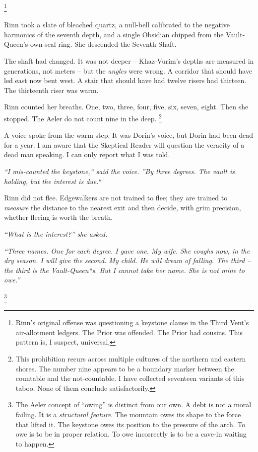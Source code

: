 \documentclass[12pt]{article}
\begin{document}
\footnote{Rinn's original offense was questioning a keystone clause in the Third Vent's air-allotment ledgers. The Prior was offended. The Prior had cousins. This pattern is, I suspect, universal.}

Rinn took a slate of bleached quartz, a null-bell calibrated to the negative harmonics of the seventh depth, and a single Obsidian chipped from the Vault-Queen's own seal-ring. She descended the Seventh Shaft.

The shaft had changed. It was not deeper -- Khaz-Vurim's depths are measured in generations, not meters -- but the \textit{angles} were wrong. A corridor that should have led east now bent west. A stair that should have had twelve risers had thirteen. The thirteenth riser was warm.

Rinn counted her breaths. One, two, three, four, five, six, seven, eight. Then she stopped. The Aeler do not count nine in the deep. \footnote{This prohibition recurs across multiple cultures of the northern and eastern shores. The number nine appears to be a boundary marker between the countable and the not-countable. I have collected seventeen variants of this taboo. None of them conclude satisfactorily.}

A voice spoke from the warm step. It was Dorin's voice, but Dorin had been dead for a year. I am aware that the Skeptical Reader will question the veracity of a dead man speaking. I can only report what I was told.

\textit{``I mis-counted the keystone,`` said the voice. ''By three degrees. The vault is holding, but the interest is due.``}

Rinn did not flee. Edgewalkers are not trained to flee; they are trained to \textit{measure} the distance to the nearest exit and then decide, with grim precision, whether fleeing is worth the breath.

\textit{``What is the interest?'' she asked.}

\textit{``Three names. One for each degree. I gave one. My wife. She coughs now, in the dry season. I will give the second. My child. He will dream of falling. The third -- the third is the Vault-Queen``s. But I cannot take her name. She is not mine to owe.''}

\footnote{The Aeler concept of ``owing'' is distinct from our own. A debt is not a moral failing. It is a \textit{structural feature}. The mountain owes its shape to the force that lifted it. The keystone owes its position to the pressure of the arch. To owe is to be in proper relation. To owe incorrectly is to be a cave-in waiting to happen.}
\end{document}
